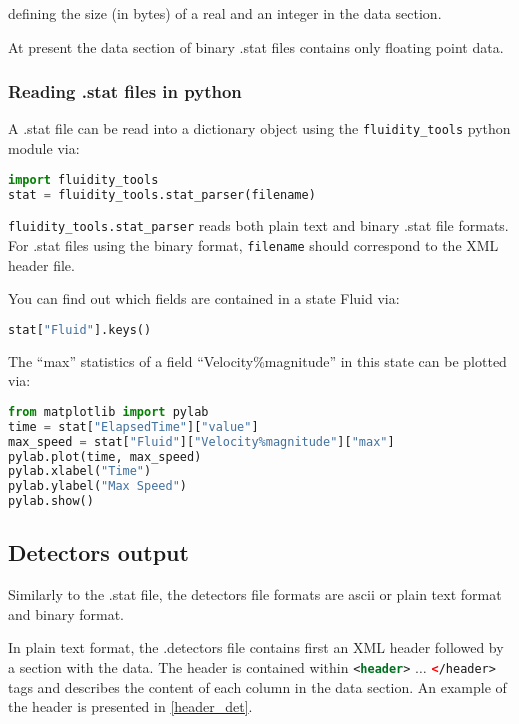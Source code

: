 defining the size (in bytes) of a real and an integer in the data section.

At present the data section of binary .stat files contains only floating point
data.

\subsubsection{Reading .stat files in python}
\label{sect:diagnostics_stat_parser}

A .stat file can be read into a dictionary object using the
\lstinline[language = Python]*fluidity_tools* python module via:

\begin{lstlisting}[language = Python]
import fluidity_tools
stat = fluidity_tools.stat_parser(filename)
\end{lstlisting}

\lstinline[language = Python]*fluidity_tools.stat_parser* reads both
plain text and binary .stat file formats. For .stat files using the binary
format, \lstinline[language = Python]*filename* should correspond to the XML
header file.

You can find out which fields are contained in a state Fluid via:

\begin{lstlisting}[language=Python]
stat["Fluid"].keys()
\end{lstlisting}

The ``max'' statistics of a field ``Velocity\%magnitude'' in this state can be
plotted via:

\begin{lstlisting}[language=Python]
from matplotlib import pylab
time = stat["ElapsedTime"]["value"]
max_speed = stat["Fluid"]["Velocity%magnitude"]["max"]
pylab.plot(time, max_speed)
pylab.xlabel("Time")
pylab.ylabel("Max Speed")
pylab.show()
\end{lstlisting}

\subsection{Detectors output}
\label{sect:detectors_output}
Similarly to the .stat file, the detectors file formats are ascii or plain text format and binary format.

In plain text format, the .detectors file contains first an XML header followed by a section with the data. The header is contained within \lstinline[language = XML]*<header>* $\ldots$
\lstinline[language = XML]*</header>* tags and describes the content of each column in the data section. An example of the header is presented in \ref{header_det}.

